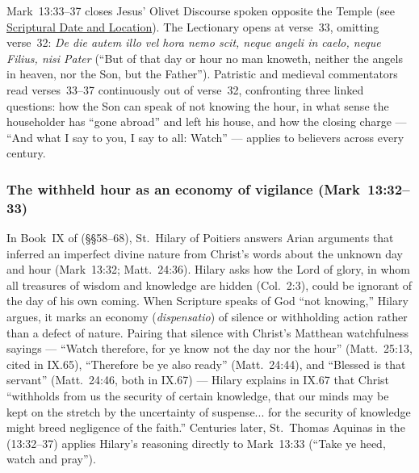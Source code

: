 Mark~13:33--37 closes Jesus' Olivet Discourse spoken opposite the Temple (see \hyperref[sec:date-location]{Scriptural Date and Location}). The Lectionary opens at verse~33, omitting verse~32: \emph{De die autem illo vel hora nemo scit, neque angeli in caelo, neque Filius, nisi Pater} (``But of that day or hour no man knoweth, neither the angels in heaven, nor the Son, but the Father''). Patristic and medieval commentators read verses~33--37 continuously out of verse~32, confronting three linked questions: how the Son can speak of not knowing the hour, in what sense the householder has ``gone abroad'' and left his house, and how the closing charge --- ``And what I say to you, I say to all: Watch'' --- applies to believers across every century.

\subsubsection{The withheld hour as an economy of vigilance (Mark~13:32--33)}
In Book~IX of  (§§58--68), St.~Hilary of Poitiers answers Arian arguments that inferred an imperfect divine nature from Christ's words about the unknown day and hour (Mark~13:32; Matt.~24:36). Hilary asks how the Lord of glory, in whom all treasures of wisdom and knowledge are hidden (Col.~2:3), could be ignorant of the day of his own coming. When Scripture speaks of God ``not knowing,'' Hilary argues, it marks an economy (\emph{dispensatio}) of silence or withholding action rather than a defect of nature. Pairing that silence with Christ's Matthean watchfulness sayings --- ``Watch therefore, for ye know not the day nor the hour'' (Matt.~25:13, cited in IX.65), ``Therefore be ye also ready'' (Matt.~24:44), and ``Blessed is that servant'' (Matt.~24:46, both in IX.67) --- Hilary explains in IX.67 that Christ ``withholds from us the security of certain knowledge, that our minds may be kept on the stretch by the uncertainty of suspense... for the security of knowledge might breed negligence of the faith.'' Centuries later, St.~Thomas Aquinas in the  (13:32--37) applies Hilary's reasoning directly to Mark~13:33 (``Take ye heed, watch and pray'').

